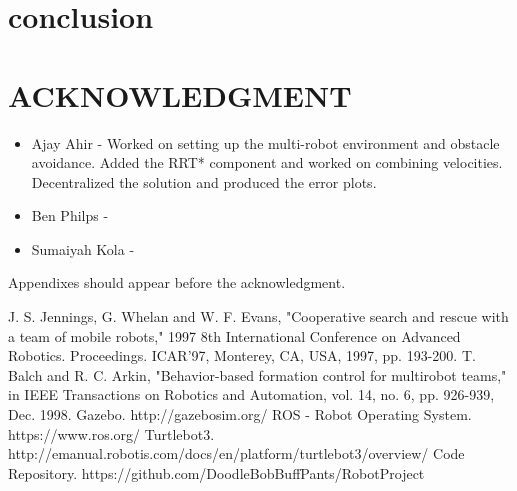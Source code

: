 \documentclass[letterpaper, 10 pt, conference]{ieeeconf}  %
\begin{document}
\section{conclusion}




\addtolength{\textheight}{-12cm}   %

\section{ACKNOWLEDGMENT}

\begin{itemize}
\item Ajay Ahir - Worked on setting up the multi-robot environment and obstacle avoidance. Added the RRT* component and worked on combining velocities. Decentralized the solution and produced the error plots.
\item Ben Philps - 
\item Sumaiyah Kola - 
\end{itemize}


Appendixes should appear before the acknowledgment.

\begin{thebibliography}{99}

 J. S. Jennings, G. Whelan and W. F. Evans, "Cooperative search and rescue with a team of mobile robots," 1997 8th International Conference on Advanced Robotics. Proceedings. ICAR'97, Monterey, CA, USA, 1997, pp. 193-200.
 T. Balch and R. C. Arkin, "Behavior-based formation control for multirobot teams," in IEEE Transactions on Robotics and Automation, vol. 14, no. 6, pp. 926-939, Dec. 1998.
 Gazebo. http://gazebosim.org/
 ROS - Robot Operating System. https://www.ros.org/
 Turtlebot3. http://emanual.robotis.com/docs/en/platform/turtlebot3/overview/
 Code Repository. https://github.com/DoodleBobBuffPants/RobotProject

\end{thebibliography}
\end{document}
